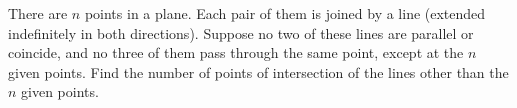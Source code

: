 There are $n$ points in a plane. Each pair of them is joined by a line (extended indefinitely in both directions). Suppose no two of these lines are parallel or coincide, and no three of them pass through the same point, except at the $n$ given points. Find the number of points of intersection of the lines other than the $n$ given points.
